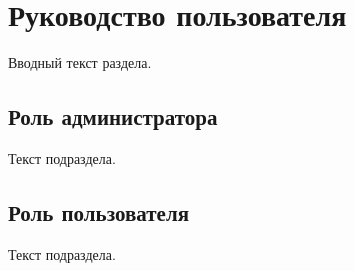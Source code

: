 \section{Руководство пользователя}
\label{sec:manual}

Вводный текст раздела.

\subsection{Роль администратора}
\label{sec:manual:admin}

Текст подраздела.

\subsection{Роль пользователя}
\label{sec:manual:user}

Текст подраздела.
